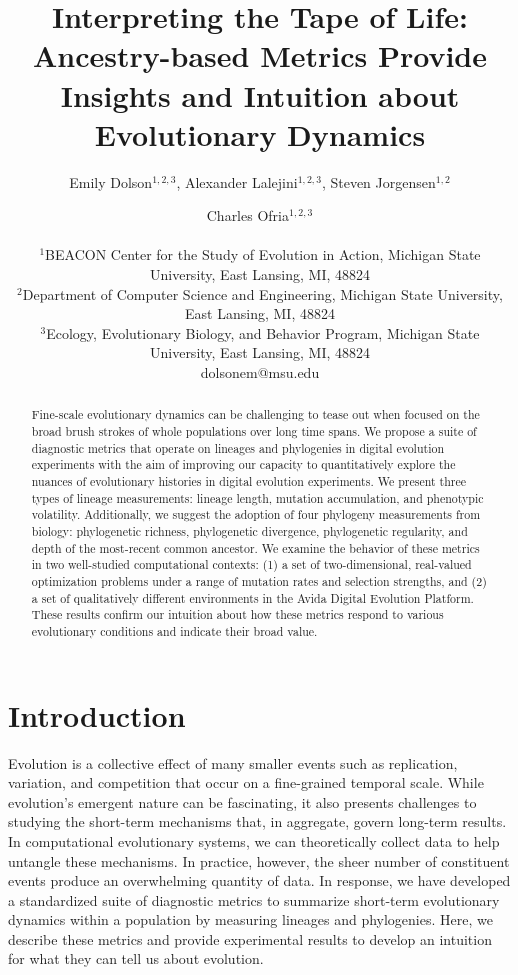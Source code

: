 \documentclass[letterpaper]{article}
\title{Interpreting the Tape of Life: Ancestry-based Metrics Provide Insights and Intuition about Evolutionary Dynamics}
\author{Emily Dolson$^{1,2,3}$, Alexander Lalejini$^{1,2, 3}$, Steven Jorgensen$^{1,2}$ \and Charles Ofria$^{1,2, 3}$ \\
\mbox{}\\
$^1$BEACON Center for the Study of Evolution in Action, Michigan State University, East Lansing, MI, 48824 \\
$^2$Department of Computer Science and Engineering, Michigan State University, East Lansing, MI, 48824 \\
$^3$Ecology, Evolutionary Biology, and Behavior Program, Michigan State University, East Lansing, MI, 48824 \\
dolsonem@msu.edu} %
\begin{document}
\maketitle

\begin{abstract}
Fine-scale evolutionary dynamics can be challenging to tease out when focused on the broad brush strokes of whole populations over long time spans. We propose a suite of diagnostic metrics that operate on lineages and phylogenies in digital evolution experiments with the aim of improving our capacity to quantitatively explore the nuances of evolutionary histories in digital evolution experiments. We present three types of lineage measurements: lineage length, mutation accumulation, and phenotypic volatility. Additionally, we suggest the adoption of four phylogeny measurements from biology: phylogenetic richness, phylogenetic divergence, phylogenetic regularity, and depth of the most-recent common ancestor. 
We examine the behavior of these metrics in two well-studied computational contexts: (1) a set of two-dimensional, real-valued optimization problems under a range of mutation rates and selection strengths, and (2) a set of qualitatively different environments in the Avida Digital Evolution Platform.  These results confirm our intuition about how these metrics respond to various evolutionary conditions and indicate their broad value.
 
\end{abstract}

\section{Introduction}

Evolution is a collective effect of many smaller events such as replication, variation, and competition that occur on a fine-grained temporal scale. While evolution's emergent nature can be fascinating, it also presents challenges to studying the short-term mechanisms that, in aggregate, govern long-term results. In computational evolutionary systems, we can theoretically collect data to help untangle these mechanisms. In practice, however, the sheer number of constituent events produce an overwhelming quantity of data.
In response, we have developed a standardized suite of diagnostic metrics to summarize short-term evolutionary dynamics within a population by measuring lineages and phylogenies. Here, we describe these metrics and provide experimental results to develop an intuition for what they can tell us about evolution.
\end{document}
